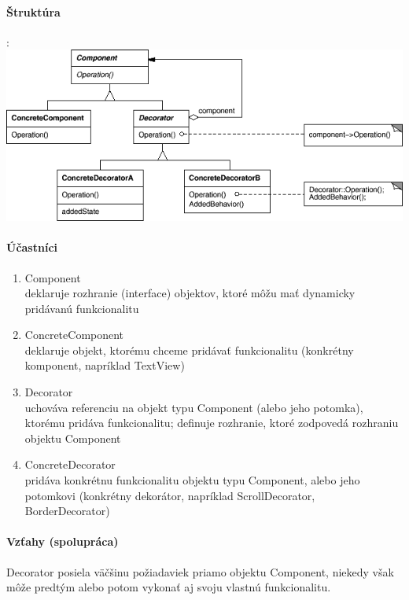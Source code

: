 		\paragraph{Štruktúra}:\\


		\includegraphics[width=.9\textwidth]{images/decorator2}
		
		\paragraph{Účastníci}
			\begin{enumerate}
				\item Component\\
				deklaruje rozhranie (interface) objektov, ktoré môžu mať dynamicky pridávanú funkcionalitu
				\item ConcreteComponent\\
				deklaruje objekt, ktorému chceme pridávať funkcionalitu (konkrétny komponent, napríklad TextView)
				\item Decorator\\
				uchováva referenciu na objekt typu Component (alebo jeho potomka), ktorému pridáva funkcionalitu; definuje rozhranie, ktoré zodpovedá rozhraniu objektu Component
				\item ConcreteDecorator\\
				pridáva konkrétnu funkcionalitu objektu typu Component, alebo jeho potomkovi (konkrétny dekorátor, napríklad ScrollDecorator, BorderDecorator)
			\end{enumerate}
		
		\paragraph{Vzťahy (spolupráca)}
		Decorator posiela väčšinu požiadaviek priamo objektu Component, niekedy však môže predtým alebo potom vykonať aj svoju vlastnú funkcionalitu.

